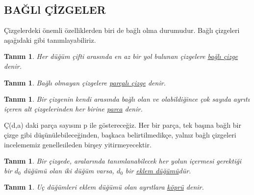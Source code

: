 \documentclass{article}
\newtheorem{cor}[theorem]{Tanım}
\begin{document}


\setcounter{section}{1}
\setcounter{subsection}{3}
\subsection{ BAĞLl ÇİZGELER}
 Çizgelerdeki önemli özelliklerden biri de bağlı
olma durumudur. Bağlı çizgeleri aşağıdaki gibi
tanımlayabiliriz. 
\begin{cor}
Her düğüm çifti arasında en az bir
yol bulunan çizgelere \underline{bağlı çizge}
denir. 
\end{cor}

\begin{cor}
Bağlı olmayan çizgelere \underline{parçalı çizge} denir.

\end{cor}

\begin{cor}
Bir çizgenin kendi arasında bağlı
olan ve olabildiğince çok sayıda
ayrıtı içeren alt çizgelerinden her
birine \underline{parca} denir. 
\end{cor}

Ç(d,a) daki parça sayısını p ile göstereceğiz. Her
bir parça, tek başına bağlı bir çizge gibi
düşünülebileceğinden, başkaca belirtilmedikçe,
yalnız bağlı çizgeleri incelememiz genelleıileden
birşey yitirmeyecektir. 

\begin{cor}
Bir çizgede, aralarında
tanımlanabilecek her yolun içermesi
gerektiği bir $d_0$ düğümü olan iki
düğüm varsa, $d_0$ bir \underline{eklem düğümü}dür. 
\end{cor}

\begin{cor}
Uç düğümleri eklem düğümü olan
ayrıtlara \underline{köprü} denir. 
\end{cor}
\end{document}

